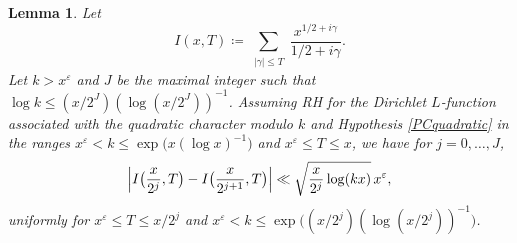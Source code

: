 \documentclass[pdflatex]{sn-jnl}%
\newcommand{\eps}{\ensuremath{\varepsilon}}
\theoremstyle{sltheorems}
\newtheorem{lem}{Lemma}
\theoremstyle{plainrem}
\theoremstyle{definition}
\begin{document}
 
\begin{lem}\label{lem21q}
Let 
\[
I(x,T) 
\coloneq 
 \sum_{\substack{ \vert \gamma \vert  \le  T 
}} \frac{x^{1/2+ i\gamma}}{1/2 + i\gamma}.
\]
Let $k > x^{\eps}$ and $J$ be the maximal integer such that $\log k \le   (x/2^J) (\log (x/2^J))^{-1} $.
Assuming RH for the Dirichlet $L$-function associated with the quadratic character modulo $k$ and
Hypothesis \ref{PCquadratic} in the ranges $x^{\eps} < k \le \exp\bigl( x(\log x)^{-1} \bigr)$ and
 $ x^{\eps} \le T \le x$,
we have for $j=0,\dots,J$,
\[
\Bigl \vert  I\bigl(\frac{x}{2^j},T\bigr)- I\bigl(\frac{x}{2^{j+1}},T\bigr)\Bigr \vert
\ll \sqrt{\frac{x}{2^j} \log (kx)} \, x^{\eps} ,
\]
uniformly for $
x^{\eps}
\le T \le  x/2^j$ and  $x^{\eps} < k \le \exp\bigl((x/2^j) (\log (x/2^j))^{-1}\bigr)$.
\end{lem}
\end{document}
